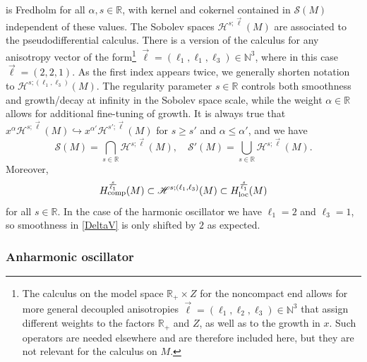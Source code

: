 \documentclass[reqno]{amsart}
\numberwithin{equation}{section}
\theoremstyle{definition}
\def\N{\mathbb N}
\def\R{\mathbb R}
\def\S{\mathscr S}
\begin{document}
is Fredholm for all $\alpha,s \in \R$, with kernel and cokernel contained in ${\mathscr S}(M)$ independent of these values. The Sobolev spaces ${\mathscr H}^{s;\vec{\ell}}(M)$ are associated to the pseudodifferential calculus. There is a version of the calculus for any anisotropy vector of the form\footnote{The calculus on the model space $\R_+\times Z$ for the noncompact end allows for more general decoupled anisotropies $\vec{\ell} = (\ell_1,\ell_2,\ell_3) \in \N^3$ that assign different weights to the factors $\R_+$ and $Z$, as well as to the growth in $x$. Such operators are needed elsewhere and are therefore included here, but they are not relevant for the calculus on $M$.} $\vec{\ell} = (\ell_1,\ell_1,\ell_3) \in \N^3$, where in this case $\vec{\ell} = (2,2,1)$. As the first index appears twice, we generally shorten notation to ${\mathscr H}^{s;(\ell_1,\ell_3)}(M)$. The regularity parameter $s \in \R$ controls both smoothness and growth/decay at infinity in the Sobolev space scale, while the weight $\alpha \in \R$ allows for additional fine-tuning of growth. It is always true that $x^{\alpha}{\mathscr H}^{s;\vec{\ell}}(M) \hookrightarrow x^{\alpha'}{\mathscr H}^{s';\vec{\ell}}(M)$ for $s \geq s'$ and $\alpha \leq \alpha'$, and we have
$$
\S(M) = \bigcap\limits_{s \in \R}{\mathscr H}^{s;\vec{\ell}}(M), \quad \S'(M) = \bigcup\limits_{s \in \R}{\mathscr H}^{s;\vec{\ell}}(M).
$$
Moreover,
$$
H^{\frac{s}{\ell_1}}_{\textup{comp}}(M) \subset {\mathscr H}^{s;(\ell_1,\ell_3)}(M)  \subset H^{\frac{s}{\ell_1}}_{\textup{loc}}(M) 
$$
for all $s \in \R$. In the case of the harmonic oscillator we have $\ell_1=2$ and $\ell_3=1$, so smoothness in \eqref{DeltaV} is only shifted by $2$ as expected.

\subsubsection*{Anharmonic oscillator}
\end{document}
